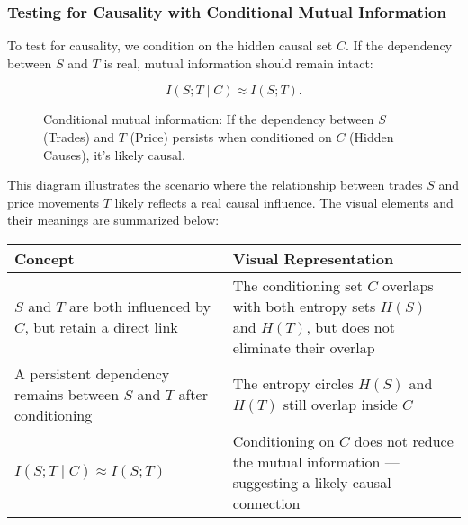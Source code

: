 \subsubsection{Testing for Causality with Conditional Mutual Information}


To test for causality, we condition on the hidden causal set \( C \). If the dependency between \( S \) and \( T \) is real, mutual information should remain intact:

\[
I(S; T \mid C) \approx I(S; T).
\]

\begin{figure}[H]
\centering
{}
\caption{Conditional mutual information: If the dependency between \( S \) (Trades) and \( T \) (Price) persists when conditioned on \( C \) (Hidden Causes), it's likely causal.}
\end{figure}

\noindent
This diagram illustrates the scenario where the relationship between trades \( S \) and price movements \( T \) likely reflects a real causal influence. The visual elements and their meanings are summarized below:

\begin{center}
\renewcommand{\arraystretch}{1.4}
\begin{tabular}{|p{5.2cm}|p{7.4cm}|}
\hline
\textbf{Concept} & \textbf{Visual Representation} \\
\hline
\( S \) and \( T \) are both influenced by \( C \), but retain a direct link & The conditioning set \( C \) overlaps with both entropy sets \( H(S) \) and \( H(T) \), but does not eliminate their overlap \\
\hline
A persistent dependency remains between \( S \) and \( T \) after conditioning & The entropy circles \( H(S) \) and \( H(T) \) still overlap inside \( C \) \\
\hline
\( I(S; T \mid C) \approx I(S; T) \) & Conditioning on \( C \) does not reduce the mutual information — suggesting a likely causal connection \\
\hline
\end{tabular}
\end{center}

